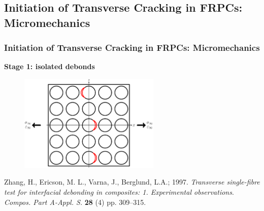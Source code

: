 \documentclass[first,firstsupp,lastsupp,last,hyperref,table]{ETHclass}
\begin{document}
\subsection[Micromechanics of Initiation]{Initiation of Transverse Cracking in FRPCs: Micromechanics}

\begin{frame}
\frametitle{\vspace{0.2cm}\small Initiation of Transverse Cracking in FRPCs: Micromechanics}
\vspace{-0.5cm}
\centering
\begin{alertblock}{\centering\scriptsize\bf Stage 1: isolated debonds}
\vspace{-0.25cm}
\begin{figure}
\centering
\includegraphics[width=0.6\textwidth]{stage1-isolateddebonds.pdf}
\end{figure}
\end{alertblock}
\vspace{-0.5cm}
{\tiny Zhang, H., Ericson, M. L., Varna, J., Berglund, L.A.; 1997. {\em\tiny Transverse single-fibre test for interfacial debonding in composites: 1. Experimental observations}. {\it\tiny Compos. Part A-Appl. S.} {\bf\tiny 28} (4) pp. 309--315.}
\end{frame}

\addtocounter{framenumber}{-1}
\end{document}
